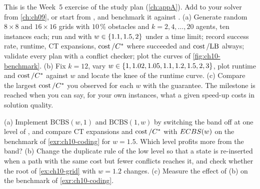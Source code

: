 \begin{exercise}
\label{exr:ch10-coding}
This is the Week~5 exercise of the study plan (\cref{ch:appA}). Add \ecbs to
your \cbs solver from \cref{ch:ch09}, or start from
, and benchmark it against \cbs. (a) Generate random
$8 \times 8$ and $16 \times 16$ grids with $10\,\%$ obstacles and $k = 2, 4,
\dots, 20$ agents, ten instances each; run \cbs and \ecbs with $w \in
\left\{ 1.1, 1.5, 2 \right\}$ under a time limit; record success rate, runtime, CT
expansions, $\operatorname{cost}/C^*$ where \cbs succeeded and $\operatorname{cost}/\mathrm{LB}$ always;
validate every plan with a conflict checker; plot the curves of
\cref{fig:ch10-benchmark}. (b) Fix $k = 12$, vary $w \in \left\{ 1, 1.02, 1.05,
1.1, 1.2, 1.5, 2, 3 \right\}$, plot runtime and $\operatorname{cost}/C^*$ against $w$ and locate the
knee of the runtime curve. (c) Compare the largest $\operatorname{cost}/C^*$ you observed
for each $w$ with the guarantee. The milestone is reached when you can say,
for your own instances, what a given speed-up costs in solution quality.
\end{exercise}

\begin{exercise}
\label{exr:ch10-variants}
(a) Implement $\mathrm{BCBS}(w, 1)$ and $\mathrm{BCBS}(1, w)$ by switching the
band off at one level of , and compare CT expansions and
$\operatorname{cost}/C^*$ with $ECBS(w)$ on the benchmark of \cref{exr:ch10-coding} for
$w = 1.5$. Which level profits more from the band? (b) Change the duplicate
rule of the low level so that a state is re-inserted when a path with the same
cost but fewer conflicts reaches it, and check whether the root of
\cref{ex:ch10-grid} with $w = 1.2$ changes. (c) Measure the effect of (b) on the benchmark of \cref{exr:ch10-coding}.
\end{exercise}

